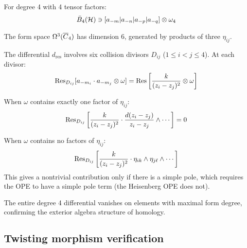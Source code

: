 \begin{computation}\label{comp:heisenberg-deg4}
For degree 4 with 4 tensor factors:
\[
\bar{B}_4(\mathcal{H}) \ni [a_{-m}|a_{-n}|a_{-p}|a_{-q}] \otimes \omega_4
\]

The form space $\Omega^3(\overline{C}_4)$ has dimension 6, generated by 
products of three $\eta_{ij}$.

The differential $d_{\text{res}}$ involves six collision divisors $D_{ij}$ 
($1 \leq i < j \leq 4$). At each divisor:
\[
\operatorname{Res}_{D_{ij}}[a_{-m_i} \cdot a_{-m_j} \otimes \omega] = \operatorname{Res}\left[\frac{k}{(z_i-z_j)^2} \otimes \omega\right]
\]

When $\omega$ contains exactly one factor of $\eta_{ij}$:
\[
\operatorname{Res}_{D_{ij}}\left[\frac{k}{(z_i-z_j)^2} \cdot \frac{d(z_i-z_j)}{z_i-z_j} \wedge \cdots\right] = 0
\]

When $\omega$ contains no factors of $\eta_{ij}$:
\[
\operatorname{Res}_{D_{ij}}\left[\frac{k}{(z_i-z_j)^2} \cdot \eta_{ik} \wedge \eta_{j\ell} \wedge \cdots\right]
\]
This gives a nontrivial contribution only if there is a simple pole, which requires 
the OPE to have a simple pole term (the Heisenberg OPE does not).

The entire degree 4 differential vanishes on elements with
maximal form degree, confirming the exterior algebra structure of homology.
\end{computation}


\subsection{Twisting morphism verification}


